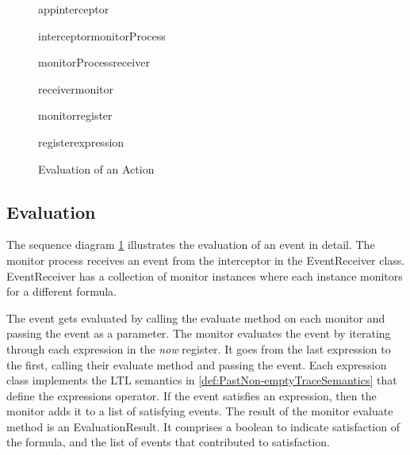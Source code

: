 \begin{figure}[h]
\begin{resizedtikzpicture}{\textwidth}
\begin{umlseqdiag}
\begin{umlcall}[op={action}]{app}{interceptor}
\begin{umlcall}[op={intent}]{interceptor}{monitorProcess}
\begin{umlcall}[op={onReceive(intent)}]{monitorProcess}{receiver}
\begin{umlfragment}[type=loop, label=foreach monitor]
\begin{umlfragment}[type=opt, label=if result.Satisfied, inner xsep=4]
\begin{umlcall}[op={Reset()}]{receiver}{monitor}
								\begin{umlcall}[op={previous.Reset()}]{monitor}{register}
									\begin{umlfragment}[type=loop, label=foreach expression, inner xsep=7]
										\begin{umlcall}[op={Reset()}]{register}{expression}\end{umlcall}
									\end{umlfragment}
								\end{umlcall}
							\end{umlcall}
						\end{umlfragment}
						
					\end{umlfragment}
			\end{umlcall}
			\end{umlcall}
		\end{umlcall}
		\end{umlseqdiag}
	\end{resizedtikzpicture}
    \caption{Evaluation of an Action}
    \label{fig:monitorSequenceDiagram}
\end{figure}

\subsection{Evaluation}
\label{sec:Evaluation}

The sequence diagram \ref{fig:monitorSequenceDiagram} illustrates the evaluation of an event in detail.  The monitor process receives an event from the interceptor in the EventReceiver class.  EventReceiver has a collection of monitor instances where each instance monitors for a different formula.

The event gets evaluated by calling the evaluate method on each monitor and passing the event as a parameter.  The monitor evaluates the event by iterating through each expression in the \textit{now} register.  It goes from the last expression to the first, calling their evaluate method and passing the event.  Each expression class implements the LTL semantics in \ref{def:PastNon-emptyTraceSemantics} that define the expressions operator.  If the event satisfies an expression, then the monitor adds it to a list of satisfying events.  The result of the monitor evaluate method is an EvaluationResult.  It comprises a boolean to indicate satisfaction of the formula, and the list of events that contributed to satisfaction.

